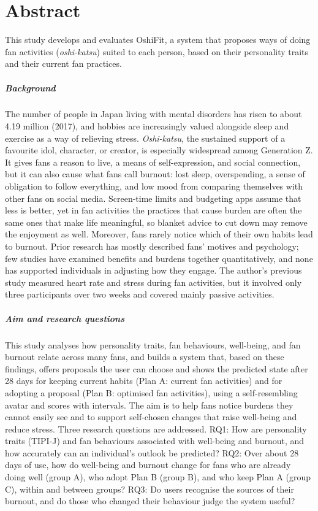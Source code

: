 \chapter*{Abstract}

This study develops and evaluates OshiFit, a system that proposes ways of doing fan activities (\textit{oshi-katsu}) suited to each person, based on their personality traits and their current fan practices.

\paragraph{Background}
The number of people in Japan living with mental disorders has risen to about 4.19 million (2017), and hobbies are increasingly valued alongside sleep and exercise as a way of relieving stress. \textit{Oshi-katsu}, the sustained support of a favourite idol, character, or creator, is especially widespread among Generation Z. It gives fans a reason to live, a means of self-expression, and social connection, but it can also cause what fans call burnout: lost sleep, overspending, a sense of obligation to follow everything, and low mood from comparing themselves with other fans on social media. Screen-time limits and budgeting apps assume that less is better, yet in fan activities the practices that cause burden are often the same ones that make life meaningful, so blanket advice to cut down may remove the enjoyment as well. Moreover, fans rarely notice which of their own habits lead to burnout. Prior research has mostly described fans' motives and psychology; few studies have examined benefits and burdens together quantitatively, and none has supported individuals in adjusting how they engage. The author's previous study measured heart rate and stress during fan activities, but it involved only three participants over two weeks and covered mainly passive activities.

\paragraph{Aim and research questions}
This study analyses how personality traits, fan behaviours, well-being, and fan burnout relate across many fans, and builds a system that, based on these findings, offers proposals the user can choose and shows the predicted state after 28 days for keeping current habits (Plan A: current fan activities) and for adopting a proposal (Plan B: optimised fan activities), using a self-resembling avatar and scores with intervals. The aim is to help fans notice burdens they cannot easily see and to support self-chosen changes that raise well-being and reduce stress. Three research questions are addressed. RQ1: How are personality traits (TIPI-J) and fan behaviours associated with well-being and burnout, and how accurately can an individual's outlook be predicted? RQ2: Over about 28 days of use, how do well-being and burnout change for fans who are already doing well (group A), who adopt Plan B (group B), and who keep Plan A (group C), within and between groups? RQ3: Do users recognise the sources of their burnout, and do those who changed their behaviour judge the system useful?

